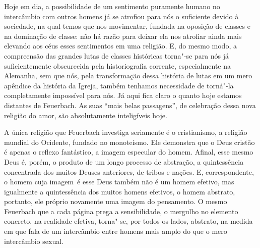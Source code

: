 Hoje em dia, a possibilidade de um sentimento puramente humano no
intercâmbio com outros homens já se atrofiou para nós o suficiente
devido à sociedade, na qual temos que nos movimentar, fundada na
oposição de classes e na dominação de classe: não há razão para deixar
ela nos atrofiar ainda mais elevando aos céus esses sentimentos em uma
religião. E, do mesmo modo, a compreensão das grandes lutas de classes
históricas torna"-se para nós já suficientemente obscurecida pela
historiografia corrente, especialmente na Alemanha, sem que nós, pela
transformação dessa história de lutas em um mero apêndice da história da
Igreja, também tenhamos necessidade de torná"-la completamente impossível %
para nós. Já aqui fica claro o quanto hoje estamos distantes %
de Feuerbach.
As suas ``mais belas passagens'', de celebração dessa nova religião do
amor, são absolutamente inteligíveis hoje.

A única religião
que Feuerbach investiga
seriamente é o cristianismo, a religião mundial do Ocidente, fundado no
monoteísmo. Ele demonstra que o Deus cristão é apenas o reflexo
fantástico, a imagem especular do homem. Afinal, esse mesmo Deus é, %
porém, o produto de um longo processo de abstração, a quintessência
concentrada dos muitos Deuses anteriores, de tribos e nações. E,
correspondente, o homem cuja imagem\est\ é esse Deus também não é um homem %
efetivo, mas igualmente a quintessência dos muitos homens efetivos, o %
homem abstrato, portanto, ele próprio novamente uma imagem do
pensamento. O
mesmo Feuerbach que
a cada página prega a sensibilidade, o mergulho no elemento concreto, na
realidade efetiva, torna"-se, por todos os lados, abstrato, na medida em
que fala de um intercâmbio entre homens mais amplo do que o mero
intercâmbio sexual.

